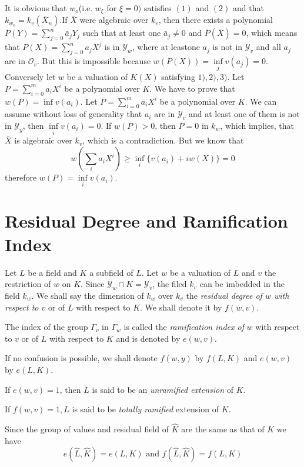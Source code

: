 It is obvious that $w_o$(i.e. $w_\xi$ for $\xi = 0)$ satisfies $(1)$
and $(2)$ and that $k_{w_o}= k_{v}(\bar{X}_{n})$.If $\bar{X}$ were
algebraic over $k_{v}$, then there exists a polynomial $\bar{P}(Y) =
\sum\limits^{n}_{j=0} \bar{a}_j Y_j$ such that at least one
$\bar{a}_j\neq 0$ and $\bar{P}(\bar{X})=0$, which means that
$P(X)=\sum\limits^n_{j = 0}a_j X^j$ is in $\mathscr{Y}_w$, where at
least\pageoriginale one $a_j$ is not in $\mathscr{Y}_v$ and all $a_j$ are in
$\mathscr{O}_v$. But this is impossible because $w(P(X))=\inf\limits_j
v(a_j)=0$. Conversely let $w$ be a valuation of $K(X)$ satisfying $1),
2), 3)$. Let $P=\sum\limits^m_{i=0}a_i X^i$ be a polynomial over
$K$. We have to prove that $w(P)=\inf v(a_i)$. Let
$P=\sum\limits^m_{i=0}a_i X^i$ be a polynomial over $K$. We can assume
without loss of generality that $a_i$ are in $\mathscr{Y}_v$ and at
least one of them is not in $\mathscr{Y}_y$, then $\inf\limits_i
v(a_i)=0$. If $w(P) > 0$, then $\bar{P}=0$ in $k_w$, which implies,
that $\bar{X}$ is algebraic over $k_v$, which is a contradiction. But
we know that 
$$
w\left(\sum\limits_i a_i X^i\right) \geq \inf\limits_i \{v(a_i) + iw(X)\}=0
$$
therefore $w(P)= \inf\limits_i  v(a_i)$.

\section{Residual Degree and Ramification Index}\label{part1:chap2:sec3} %

Let $L$ be a field and $K$ a subfield of $L$. Let $w$ be a valuation
of $L$ and $v$ the restriction of $w$ on $K$. Since $\mathscr{Y}_w
\cap K = \mathscr{Y}_v$, the filed $k_v$ can be imbedded in the field
$k_w$. We shall say the dimension of $k_w$ over $k_v$ the \textit{residual
  degree of $w$ with respect to $v$} or of $L$ with respect to $K$. We
shall denote it by $f(w, v)$. 

The index of the group $\Gamma_v$ in $\Gamma_w$ is called the
\textit{ramification index of} $w$ with respect to $v$ or of $L$
with respect to $K$ and is denoted by $e(w, v)$. 

If no confusion is possible, we shall denote $f(w, y)$ by $f(L,K)$ and\pageoriginale
$e(w, v)$ by $e(L, K)$. 

If $e(w, v)= 1$, then $L$ is said to be an \textit{unramified
  extension} of $K$. 

If $f(w, v) = 1, L$ is said to be \textit{totally ramified} extension
of $K$. 

Since the group of values and residual field of $\hat{K}$ are the
same as that of $K$ we  have 
$$
e(\hat{L}, \hat{K}) = e (L, K) \text { and } f(\hat{L},
\hat{K})= f (L, K) 
$$

